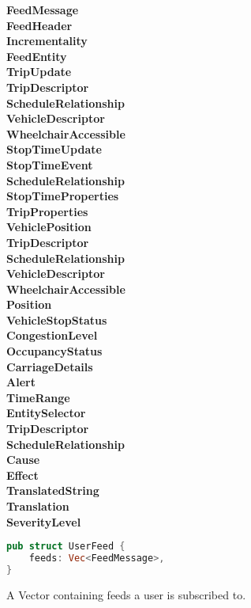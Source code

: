 \documentclass[a4paper,10pt]{article}
\begin{document}
\begin{tabbing}
    \textbf{FeedMessage} \\
    \quad \= \textbf{FeedHeader} \\
    \quad \quad \= \textbf{Incrementality} \\
    \quad \= \textbf{FeedEntity} \\
    \quad \quad \= \textbf{TripUpdate} \\
    \quad \quad \quad \= \textbf{TripDescriptor} \\
    \quad \quad \quad \quad \= \textbf{ScheduleRelationship} \\
    \quad \quad \quad \= \textbf{VehicleDescriptor} \\
    \quad \quad \quad \quad \= \textbf{WheelchairAccessible} \\
    \quad \quad \quad \= \textbf{StopTimeUpdate} \\
    \quad \quad \quad \quad \= \textbf{StopTimeEvent} \\
    \quad \quad \quad \quad \= \textbf{ScheduleRelationship} \\
    \quad \quad \quad \quad \= \textbf{StopTimeProperties} \\
    \quad \quad \= \textbf{TripProperties} \\
    \quad \= \textbf{VehiclePosition} \\
    \quad \quad \= \textbf{TripDescriptor} \\
    \quad \quad \quad \= \textbf{ScheduleRelationship} \\
    \quad \quad \quad \= \textbf{VehicleDescriptor} \\
    \quad \quad \quad \quad \= \textbf{WheelchairAccessible} \\
    \quad \quad \quad \= \textbf{Position} \\
    \quad \quad \quad \= \textbf{VehicleStopStatus} \\
    \quad \quad \quad \= \textbf{CongestionLevel} \\
    \quad \quad \quad \= \textbf{OccupancyStatus} \\
    \quad \quad \quad \= \textbf{CarriageDetails} \\
    \quad \= \textbf{Alert} \\
    \quad \quad \= \textbf{TimeRange} \\
    \quad \quad \= \textbf{EntitySelector} \\
    \quad \quad \quad \= \textbf{TripDescriptor} \\
    \quad \quad \quad \quad \= \textbf{ScheduleRelationship} \\
    \quad \quad \= \textbf{Cause} \\
    \quad \quad \= \textbf{Effect} \\
    \quad \quad \= \textbf{TranslatedString} \\
    \quad \quad \quad \= \textbf{Translation} \\
    \quad \quad \= \textbf{SeverityLevel} \\
\end{tabbing}
\begin{lstlisting}[language=rust]
pub struct UserFeed {
    feeds: Vec<FeedMessage>,
}
\end{lstlisting}
A Vector containing feeds a user is subscribed to.
\end{document}
